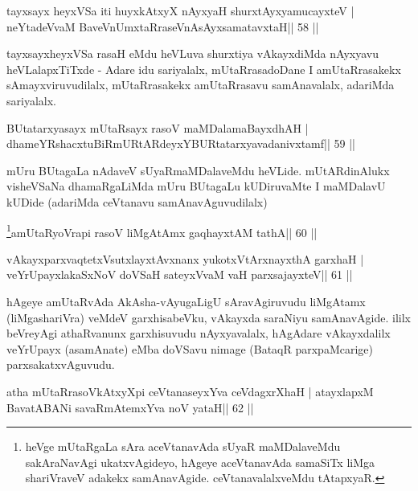 \begin{shl}
tayxsayx heyxVSa iti huyxkAtxyX nAyxyaH shurxtAyx\s yamucayxteV |
neYtadeVvaM BaveVnUmxtaRraseVnAsAyxsamatavxtaH\hfill || 58 ||
\end{shl}

\begin{artha}
tayxsayxheyxVSa rasaH eMdu heVLuva shurxtiya vAkayxdiMda nAyxyavu heVLalapxTiTxde - Adare idu sariyalalx, mUtaRrasadoDane I amUtaRrasakekx sAmayxviruvudilalx, mUtaRrasakekx amUtaRrasavu samAnavalalx, adariMda sariyalalx.
\end{artha}



\begin{shl}
BUtatarxyasayx mUtaRsayx rasoV maMDalamaBayxdhAH |
dhameYRshacxtuBiRmURtARdeyxYBURtatarxyavadanivxtamf\hfill || 59 ||
\end{shl}

\begin{artha}
mUru BUtagaLa nAdaveV sUyaRmaMDalaveMdu heVLide. mUtARdinAlukx
visheVSaNa dhamaRgaLiMda mUru BUtagaLu kUDiruvaMte I maMDalavU kUDide
(adariMda ceVtanavu samAnavAguvudilalx)
\end{artha}


\begin{shl}
\footnote{heVge mUtaRgaLa sAra aceVtanavAda sUyaR maMDalaveMdu sakAraNavAgi ukatxvAgideyo, hAgeye aceVtanavAda samaSiTx liMga shariVraveV adakekx samAnavAgide. ceVtanavalalxveMdu tAtapxyaR.}amUtaRyoVrapi rasoV liMgAtAmx gaqhayxtAM tathA\hfill || 60 ||
\end{shl}

\begin{shl}
vAkayxparxvaqtetxVsutxlayxtAvxnanx yukotxV\s tArxnayxthA garxhaH |
veYrUpayxlakaSxNoV doVSaH sateyxVvaM vaH parxsajayxteV\hfill || 61 ||
\end{shl}

\begin{artha}
hAgeye amUtaRvAda AkAsha-vAyugaLigU sAravAgiruvudu liMgAtamx (liMgashariVra) veMdeV garxhisabeVku, vAkayxda saraNiyu samAnavAgide. ililx beVreyAgi athaRvanunx garxhisuvudu nAyxyavalalx, hAgAdare vAkayxdalilx veYrUpayx (asamAnate) eMba doVSavu nimage (BataqR parxpaMcarige) parxsakatxvAguvudu.
\end{artha}



\begin{shl}
atha mUtaRrasoVkAtxyX\s pi ceVtanaseyxYva ceVdagxrXhaH |
atayxlapxM BavatA\s BANi savaRmAtemxYva noV yataH\hfill || 62 ||
\end{shl}

